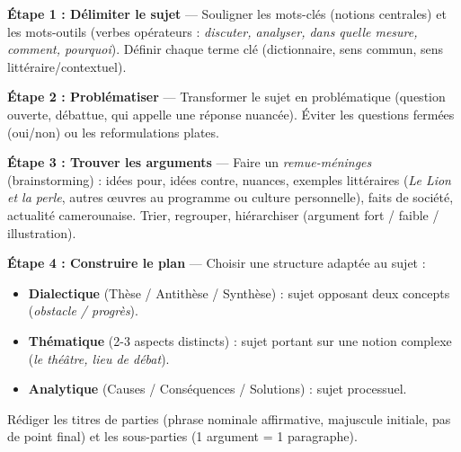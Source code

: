 \documentclass[11pt]{article}
\newcommand{\cle}[1]{{\popxbold\color{popdark}#1}}
\begin{document}
\begin{methode}
\textbf{Étape 1 : Délimiter le sujet} — Souligner les \cle{mots-clés} (notions centrales) et les \cle{mots-outils} (verbes opérateurs : \emph{discuter, analyser, dans quelle mesure, comment, pourquoi}). Définir chaque terme clé (dictionnaire, sens commun, sens littéraire/contextuel).\par
\textbf{Étape 2 : Problématiser} — Transformer le sujet en \cle{problématique} (question ouverte, débattue, qui appelle une réponse nuancée). Éviter les questions fermées (oui/non) ou les reformulations plates.\par
\textbf{Étape 3 : Trouver les arguments} — Faire un \emph{remue-méninges} (brainstorming) : idées pour, idées contre, nuances, exemples littéraires (\emph{Le Lion et la perle}, autres œuvres au programme ou culture personnelle), faits de société, actualité camerounaise. Trier, regrouper, hiérarchiser (argument fort / faible / illustration).\par
\textbf{Étape 4 : Construire le plan} — Choisir une structure adaptée au sujet :
\begin{itemize}
\item \textbf{Dialectique} (Thèse / Antithèse / Synthèse) : sujet opposant deux concepts (\emph{obstacle / progrès}).
\item \textbf{Thématique} (2-3 aspects distincts) : sujet portant sur une notion complexe (\emph{le théâtre, lieu de débat}).
\item \textbf{Analytique} (Causes / Conséquences / Solutions) : sujet processuel.
\end{itemize}
Rédiger les \cle{titres de parties} (phrase nominale affirmative, majuscule initiale, pas de point final) et les \cle{sous-parties} (1 argument = 1 paragraphe).
\end{methode}
\end{document}
